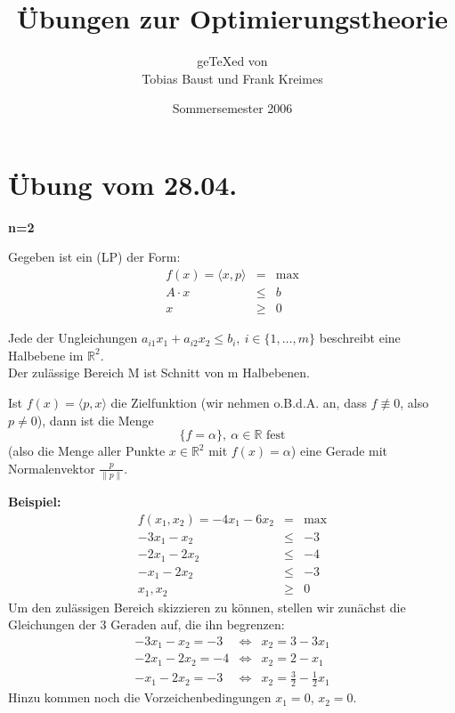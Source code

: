\documentclass[a4paper,11pt,twoside,titlepage]{article}
\title{Übungen zur Optimierungstheorie}
\date{Sommersemester 2006}
\author{ge\TeX ed von\\Tobias Baust und Frank Kreimes}
\newcommand{\R}{{\mathbb R}}
\begin{document}
\maketitle
\thispagestyle{empty}
\tableofcontents
{}
\thispagestyle{empty}
\cleardoublepage

\renewcommand{\thepage}{\arabic{page}}
\setcounter{page}{1}
\renewcommand{\thesection}{\arabic{section}}

\section{Übung vom 28.04.}
\textbf{n=2}

Gegeben ist ein (LP) der Form:
\begin{eqnarray*}
f(x)=\langle x,p\rangle&=&\max\\
A\cdot x&\leq&b\\
x&\geq&0
\end{eqnarray*}

Jede der Ungleichungen $a_{i1}x_1+a_{i2}x_2\leq b_i,\ i\in\{1,\ldots,m\}$ beschreibt eine Halbebene im $\R^2$.\\
Der zulässige Bereich M ist Schnitt von m Halbebenen.

Ist $f(x)=\langle p,x\rangle$ die Zielfunktion (wir nehmen o.B.d.A. an, dass $f\not\equiv0$, also $p\neq0$), dann ist die Menge \[\{f=\alpha\},\ \alpha\in\R\mbox{~fest}\] (also die Menge aller Punkte $x\in\R^2$ mit $f(x)=\alpha$) eine Gerade mit Normalenvektor $\frac{p}{\|p\|}$.

\textbf{Beispiel:}
\begin{eqnarray*}
f(x_1,x_2)=-4x_1-6x_2&=&\max\\
-3x_1-x_2&\leq&-3\\
-2x_1-2x_2&\leq&-4\\
-x_1-2x_2&\leq&-3\\
x_1,x_2&\geq&0
\end{eqnarray*}
Um den zulässigen Bereich skizzieren zu können, stellen wir zunächst die Gleichungen der 3 Geraden auf, die ihn begrenzen:
\begin{eqnarray}
-3x_1-x_2=-3&\Leftrightarrow&x_2=3-3x_1\\
-2x_1-2x_2=-4&\Leftrightarrow&x_2=2-x_1\\
-x_1-2x_2=-3&\Leftrightarrow&x_2=\frac{3}{2}-\frac{1}{2}x_1
\end{eqnarray}
Hinzu kommen noch die Vorzeichenbedingungen $x_1=0$, $x_2=0$.
\end{document}
